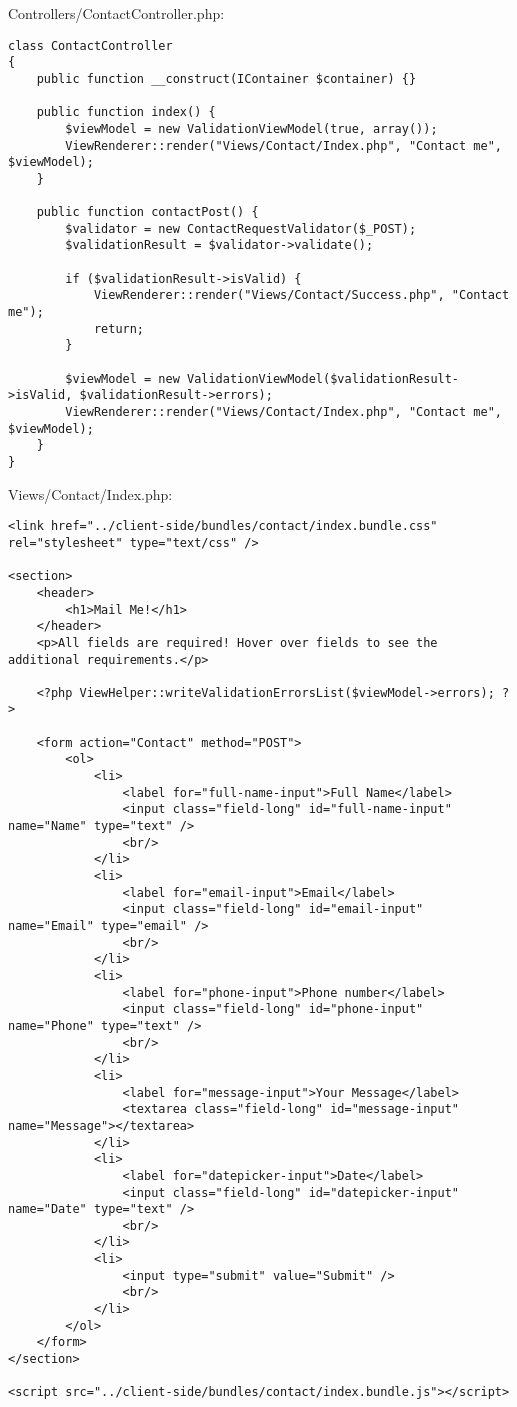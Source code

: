 \documentclass[a4paper,14pt]{extarticle}
\begin{document}
Controllers/ContactController.php:
\begin{lstlisting}
class ContactController
{
    public function __construct(IContainer $container) {}

    public function index() {
        $viewModel = new ValidationViewModel(true, array());
        ViewRenderer::render("Views/Contact/Index.php", "Contact me", $viewModel);
    }

    public function contactPost() {
        $validator = new ContactRequestValidator($_POST);
        $validationResult = $validator->validate();

        if ($validationResult->isValid) {
            ViewRenderer::render("Views/Contact/Success.php", "Contact me");
            return;
        }

        $viewModel = new ValidationViewModel($validationResult->isValid, $validationResult->errors);
        ViewRenderer::render("Views/Contact/Index.php", "Contact me", $viewModel);
    }
}
\end{lstlisting}

Views/Contact/Index.php:
\begin{lstlisting}
<link href="../client-side/bundles/contact/index.bundle.css" rel="stylesheet" type="text/css" />

<section>
    <header>
        <h1>Mail Me!</h1>
    </header>
    <p>All fields are required! Hover over fields to see the additional requirements.</p>

    <?php ViewHelper::writeValidationErrorsList($viewModel->errors); ?>

    <form action="Contact" method="POST">
        <ol>
            <li>
                <label for="full-name-input">Full Name</label>
                <input class="field-long" id="full-name-input" name="Name" type="text" />
                <br/>
            </li>
            <li>
                <label for="email-input">Email</label>
                <input class="field-long" id="email-input" name="Email" type="email" />
                <br/>
            </li>
            <li>
                <label for="phone-input">Phone number</label>
                <input class="field-long" id="phone-input" name="Phone" type="text" />
                <br/>
            </li>
            <li>
                <label for="message-input">Your Message</label>
                <textarea class="field-long" id="message-input" name="Message"></textarea>
            </li>
            <li>
                <label for="datepicker-input">Date</label>
                <input class="field-long" id="datepicker-input" name="Date" type="text" />
                <br/>
            </li>
            <li>
                <input type="submit" value="Submit" />
                <br/>
            </li>
        </ol>
    </form>
</section>

<script src="../client-side/bundles/contact/index.bundle.js"></script>
\end{lstlisting}
\end{document}
